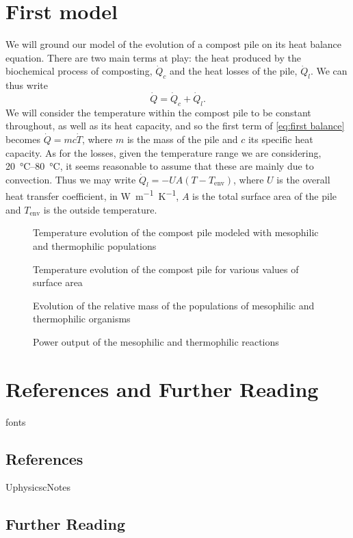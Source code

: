 \documentclass[12pt, a4paper, twocolumn]{article}
\numberwithin{table}{section}
\numberwithin{figure}{section}
\numberwithin{equation}{section}
\begin{document}
\section{First model}
We will ground our model of the evolution of a compost pile on its heat balance equation. There are two main terms at play: the heat produced by the biochemical process of composting, \( \dot{Q}_c \) and the heat losses of the pile, \( \dot{Q}_l \). We can thus write
\begin{equation} \label{eq:first balance}
	\dot{Q} = \dot{Q}_c + \dot{Q}_l. 
\end{equation}
We will consider the temperature within the compost pile to be constant throughout, as well as its heat capacity, and so the first term of \cref{eq:first balance} becomes \( \dot{Q} = mc\dot{T} \), where \( m \) is the mass of the pile and \( c \) its specific heat capacity. As for the losses, given the temperature range we are considering, \SIrange{20}{80}{\celsius}, it seems reasonable to assume that these are mainly due to convection. Thus we may write \( \dot{Q}_l = -UA\left(T - T_\text{env}\right) \), where \( U \) is the overall heat transfer coefficient, in \si{W.m^{-1}.K^{-1}}, \( A \) is the total surface area of the pile and \( T_\text{env} \) is the outside temperature. 

\begin{figure}[htb]
	\sffamily \footnotesize \centering
	
	\caption{Temperature evolution of the compost pile modeled with mesophilic and thermophilic populations}
	\label{fig:temp-mesos-termos}
\end{figure}

\begin{figure}[htb]
	\sffamily \footnotesize \centering
	
	\caption{Temperature evolution of the compost pile for various values of surface area}
	\label{fig:temp-arees}
\end{figure}

\begin{figure}[htb]
	\sffamily \footnotesize \centering
	
	\caption{Evolution of the relative mass of the populations of mesophilic and thermophilic organisms}
	\label{fig:poblacions}
\end{figure}

\begin{figure}[htb]
	\sffamily \footnotesize \centering
	
	\caption{Power output of the mesophilic and thermophilic reactions}
	\label{fig:potencies}
\end{figure}

\clearpage
\appendix
\section{References and Further Reading}
\begin{btSect}{fonts}
	
	\subsection*{References}	
	\btPrintCited
\end{btSect}

\begin{btSect}{UphysicscNotes}
	
	\subsection*{Further Reading}	
	\btPrintNotCited
\end{btSect}
\end{document}
